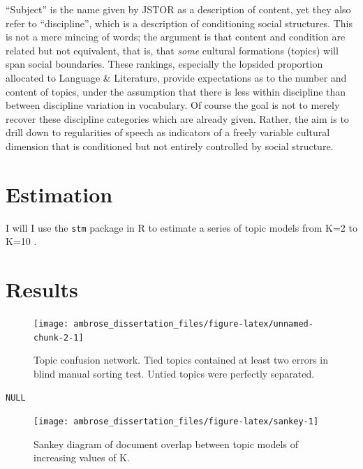 \documentclass[]{book}
\theoremstyle{definition}
\theoremstyle{definition}
\theoremstyle{definition}
\theoremstyle{remark}
\begin{document}
``Subject'' is the name given by JSTOR as a description of content, yet
they also refer to ``discipline'', which is a description of
conditioning social structures. This is not a mere mincing of words; the
argument is that content and condition are related but not equivalent,
that is, that \emph{some} cultural formations (topics) will span social
boundaries. These rankings, especially the lopsided proportion allocated
to Language \& Literature, provide expectations as to the number and
content of topics, under the assumption that there is less within
discipline than between discipline variation in vocabulary. Of course
the goal is not to merely recover these discipline categories which are
already given. Rather, the aim is to drill down to regularities of
speech as indicators of a freely variable cultural dimension that is
conditioned but not entirely controlled by social structure.

\hypertarget{estimation}{%
\section{Estimation}\label{estimation}}

I will I use the \texttt{stm} package in R to estimate a series of topic
models from K=2 to K=10
\citep{Robertsstructuraltopicmodel2013, Roberts2018stm}.

\hypertarget{results}{%
\section{Results}\label{results}}

\begin{figure}

{\centering \texttt{[image: ambrose\_dissertation\_files/figure-latex/unnamed-chunk-2-1]} 

}

\caption{Topic confusion network. Tied topics contained at least two errors in blind manual sorting test. Untied topics were perfectly separated.}\label{fig:unnamed-chunk-2}
\end{figure}

\begin{verbatim}
NULL
\end{verbatim}

\begin{figure}

{\centering \texttt{[image: ambrose\_dissertation\_files/figure-latex/sankey-1]} 

}

\caption{Sankey diagram of document overlap between topic models of increasing values of K.}\label{fig:sankey}
\end{figure}
\end{document}
